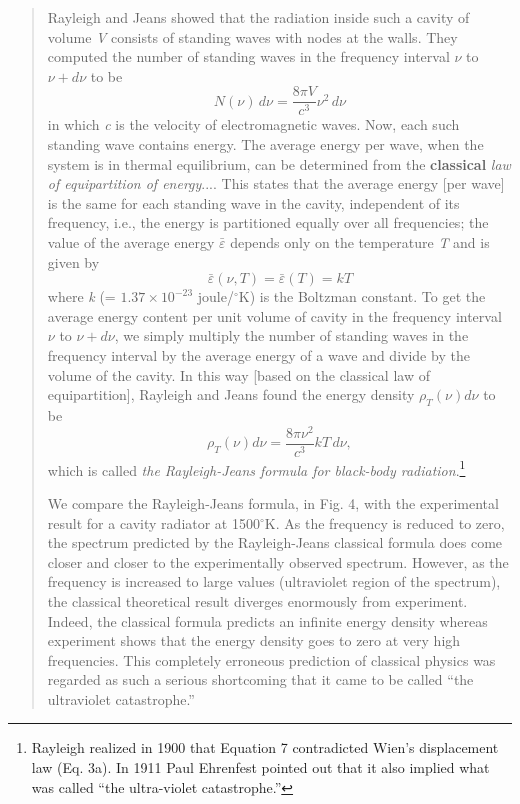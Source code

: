 \begin{quotation}
Rayleigh and Jeans showed that the radiation inside such a cavity of
volume \emph{V} consists of standing waves with nodes at the walls. They
computed the number of standing waves in the frequency interval $\nu$
to $\nu + d\nu$ to be
%
\begin{equation}
N(\nu)\, d\nu = \frac{8\pi V}{c^3}\nu^{2}\, d\nu %
\end{equation}
%
in which \emph{c} is the velocity of electromagnetic waves. Now, each
such standing wave contains energy. The average energy per wave, when
the system is in thermal equilibrium, can be determined from the
\textbf{classical} \emph{law of equipartition of energy}.... This states
that the average energy {[}per wave{]} is the same for each standing
wave in the cavity, independent of its frequency, i.e., the energy is
partitioned equally over all frequencies; the value of the average
energy $\bar{\varepsilon}$ depends only on the temperature \emph{T} and is given by
%
\begin{equation}
\bar{\varepsilon}(\nu, T) = \bar{\varepsilon}(T) = kT %
\end{equation}
%
where \emph{k} (= $1.37 \times 10^{-23}$ joule/$^\circ$K) is the
Boltzman constant. To get the average energy content per unit volume of
cavity in the frequency interval $\nu$ to $\nu\! +\! d\nu$, we
simply multiply the number of standing waves in the frequency interval
by the average energy of a wave and divide by the volume of the cavity.
In this way {[}based on the classical law of equipartition{]}, Rayleigh
and Jeans found the energy density $\rho_T(\nu) d\nu$ to be
%
\begin{equation}
\rho_T(\nu) d\nu = \frac{8\pi \nu^2}{c^3}kT\, d\nu, %
\end{equation}
%
which is called \emph{the Rayleigh-Jeans formula for black-body
radiation}.\footnote{Rayleigh realized in 1900 that Equation 7
  contradicted Wien's displacement law (Eq. 3a). In 1911 Paul Ehrenfest
  pointed out that it also implied what was called ``the ultra-violet
  catastrophe.''}

We compare the Rayleigh-Jeans formula, in Fig. 4, with the
experimental result for a cavity radiator at 1500$^\circ$K. As the frequency is
reduced to zero, the spectrum predicted by the Rayleigh-Jeans classical
formula does come closer and closer to the experimentally observed
spectrum. However, as the frequency is increased to large values
(ultraviolet region of the spectrum), the classical theoretical
result diverges enormously from experiment. Indeed, the classical
formula predicts an infinite energy density whereas experiment shows
that the energy density goes to zero at very high frequencies. This
completely erroneous prediction of classical physics was regarded as
such a serious shortcoming that it came to be called ``the ultraviolet
catastrophe.''


\end{quotation}
